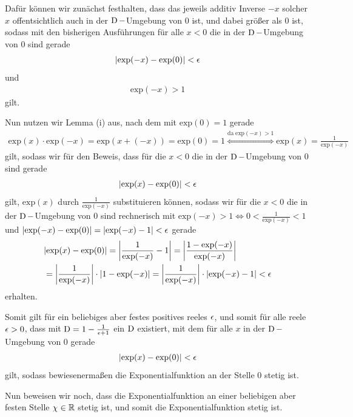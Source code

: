\begin{lsg}
\begin{enumerate}[label=$\mathrm{(\roman*)}$, ref=$\mathrm{\roman*}$]
Dafür können wir zunächst festhalten, dass das jeweils additiv Inverse $-x$ solcher $x$ offentsichtlich auch in der $\operatorname{D}-$Umgebung von $0$ ist, und dabei größer als $0$ ist, sodass mit den bisherigen Ausführungen für alle $x<0$ die in der $\operatorname{D}-$Umgebung von $0$ sind gerade
\begin{align*}
  |\textrm{exp}(-x)-\textrm{exp}(0)|<\epsilon
 \end{align*}
und
\begin{align*}
  \textrm{exp}(-x)>1
 \end{align*}
 gilt.
 
 Nun nutzen wir Lemma (i) aus, nach dem mit $\textrm{exp}(0)=1$ gerade
 \begin{align*}
  \textrm{exp}(x) \cdot \textrm{exp}(-x)=\textrm{exp}(x+(-x))=\textrm{exp}(0)=1 \stackrel{\textrm{da} \; \textrm{exp}(-x) >1}{\Leftrightarrow} \textrm{exp}(x)= \frac{1}{\textrm{exp}(-x)}
 \end{align*}gilt, sodass wir für den Beweis, dass für die $x<0$ die in der $\operatorname{D}-$Umgebung von $0$ sind gerade
\begin{align*}
  |\textrm{exp}(x)-\textrm{exp}(0)|<\epsilon
 \end{align*}
gilt, $\textrm{exp}(x)$ durch $\frac{1}{\textrm{exp}(-x)}$ substituieren können, sodass wir für die $x<0$ die in der $\operatorname{D}-$Umgebung von $0$ sind rechnerisch mit \newline $\textrm{exp}(-x)>1 \Leftrightarrow 0<\frac{1}{\textrm{exp}(-x)} <1 $ und $|\textrm{exp}(-x)-\textrm{exp}(0)|=|\textrm{exp}(-x)-1|<\epsilon$ gerade
\begin{align*}
  &|\textrm{exp}(x)-\textrm{exp}(0)|= \left|\frac{1}{\textrm{exp}(-x)}-1\right| = \left|\frac{1-\textrm{exp}(-x)}{\textrm{exp}(-x)} \right|\\&= \left|\frac{1}{\textrm{exp}(-x)} \right|\cdot\left|1-\textrm{exp}(-x) \right|= \left|\frac{1}{\textrm{exp}(-x)} \right|\cdot\left|\textrm{exp}(-x)-1 \right|<\epsilon
 \end{align*}
erhalten.

Somit gilt für ein beliebiges aber festes positives reeles $\epsilon$, und somit für alle reele $\epsilon>0$, dass mit $\operatorname{D}=1-\frac{1}{\epsilon+1}$ ein $\operatorname{D}$ existiert, mit dem für alle $x$ in der $\operatorname{D}-$ Umgebung von $0$ gerade
\begin{align*}
  |\textrm{exp}(x)-\textrm{exp}(0)|<\epsilon
 \end{align*}
gilt, sodass bewiesenermaßen die Exponentialfunktion an der Stelle $0$ stetig ist.
 
Nun beweisen wir noch, dass die Exponentialfunktion an einer beliebigen aber festen Stelle $\chi \in \mathbb{R}$ stetig ist, und somit die Exponentialfunktion stetig ist.


\end{enumerate}
\end{lsg}

